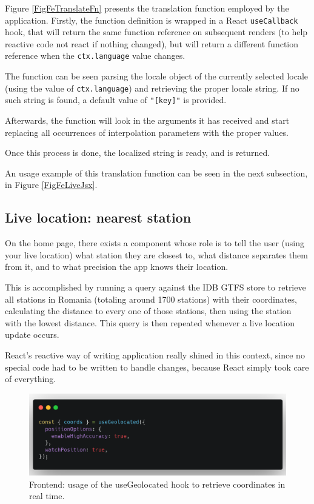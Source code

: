 Figure \ref{FigFeTranslateFn} presents the translation function employed by the application. First\-ly, the function definition is wrapped in a React \verb|useCallback| hook, that will return the same function reference on subsequent renders (to help reactive code not react if nothing changed), but will return a different function reference when the \verb|ctx.language| value changes.

The function can be seen parsing the locale object of the currently selected locale (using the value of \verb|ctx.language|) and retrieving the proper locale string. If no such string is found, a default value of \verb|"[key]"| is provided.

Afterwards, the function will look in the arguments it has received and start replacing all occurrences of interpolation parameters with the proper values.

Once this process is done, the localized string is ready, and is returned.

An usage example of this translation function can be seen in the next subsection, in Figure \ref{FigFeLiveJsx}.

\subsection{Live location: nearest station}
On the home page, there exists a component whose role is to tell the user (using your live location) what station they are closest to, what distance separates them from it, and to what precision the app knows their location.

This is accomplished by running a query against the IDB GTFS store to retrieve all stations in Romania (totaling around 1700 stations) with their coordinates, calculating the distance to every one of those stations, then using the station with the lowest distance. This query is then repeated whenever a live location update occurs.

React's reactive way of writing application really shined in this context, since no special code had to be written to handle changes, because React simply took care of everything.

\begin{figure}[htbp]
    \centering
    \includegraphics[width=.9\textwidth]{./figures/code/fe_live_coords.png}
    \caption{Frontend: usage of the useGeolocated hook to retrieve coordinates in real time.}
    \label{FigFeLiveCoords}
\end{figure}


